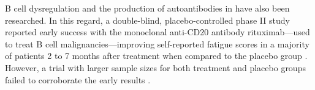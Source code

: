 B cell dysregulation and the production of autoantibodies in \cfs have also been researched.
In this regard, a double-blind, placebo-controlled phase II study reported early success with the monoclonal anti-CD20 antibody rituximab---used to treat B cell malignancies---improving self-reported fatigue scores in a majority of \cfs patients 2 to 7 months after treatment when compared to the placebo group \citep{fluge2011BenefitBlymphocyte}.
However, a 
trial with larger sample sizes for both treatment and placebo groups failed to corroborate the early results \citep{flugeBLymphocyteDepletionPatients2019, rowe2019MyalgicEncephalomyelitis}.



